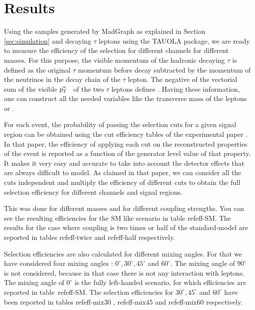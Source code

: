 \section{Results}\label{sec:results} 


Using the \wprime samples generated by MadGraph as explained in Section \ref{sec:simulation} and decaying $\tau$ leptons using the TAUOLA package, we are ready to measure the efficiency of the selection for different channels for different \wprime masses. For this purpose, the visible momentum of the hadronic decaying $\tau$ is defined as the original $\tau$ momentum before decay subtracted by the momentum of the neutrinos in the decay chain of the $\tau$ lepton. The negative of the vectorial sum of the visible $\vec{p_T}$ ~of the two $\tau$ leptons defines \MET. Having these information, one can construct all the needed variables like the transverse mass of the leptons or \mttwo. 

For each event, the probability of passing the selection cuts for a given signal region can be obtained using the cut efficiency tables of the experimental paper \cite{Khachatryan:2016trj}. In that paper, the efficiency of applying each cut on the reconstructed properties of the event is reported as a function of the generator level value of that property. It makes it very easy and accurate to take into account the detector effects that are always difficult to model. As claimed in that paper, we can consider all the cuts independent and multiply the efficiency of different cuts to obtain the full selection efficiency for different channels and signal regions.

This was done for different \wprime masses and for different coupling strengths. You can see the resulting efficiencies for the SM like scenario in table ref{eff-SM}. The results for the case where coupling is two times or half of the standard-model are reported in tables ref{eff-twice} and ref{eff-half} respectively.



Selection efficiencies are also calculated for different mixing angles. For that we have considered four mixing angles : $0^\circ, 30^\circ, 45^\circ$ and $60^\circ$. The mixing angle of $90^\circ$ is not considered, because in that case there is not any interaction with leptons. The mixing angle of $0^\circ$ is the fully left-handed scenario, for which efficiencies are reported in table~ref{eff-SM}.  The selection efficiencies for  $30^\circ, 45^\circ$ and $60^\circ$ have been reported in tables ref{eff-mix30} , ref{eff-mix45} and ref{eff-mix60} respectively.



